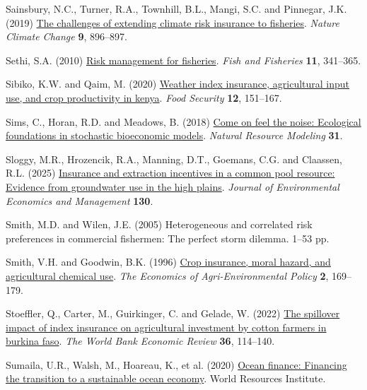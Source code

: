 \documentclass[
  letterpaper,
  DIV=11,
  numbers=noendperiod]{scrartcl}
\newlength{\cslhangindent}
\newenvironment{CSLReferences}[2] %
 {\begin{list}{}{%
  \setlength{\itemindent}{0pt}
  \setlength{\leftmargin}{0pt}
  \setlength{\parsep}{0pt}
  \ifodd #1
   \setlength{\leftmargin}{\cslhangindent}
   \setlength{\itemindent}{-1\cslhangindent}
  \fi
  \setlength{\itemsep}{#2\baselineskip}}}
 {\end{list}}
\theoremstyle{plain}
\theoremstyle{plain}
\theoremstyle{remark}
\begin{document}
\begin{CSLReferences}{1}{0}
Sainsbury, N.C., Turner, R.A., Townhill, B.L., Mangi, S.C. and Pinnegar,
J.K. (2019) \href{https://doi.org/10.1038/s41558-019-0645-z}{The
challenges of extending climate risk insurance to fisheries}.
\emph{Nature Climate Change} \textbf{9}, 896--897.

Sethi, S.A. (2010)
\href{https://doi.org/10.1111/j.1467-2979.2010.00363.x}{Risk management
for fisheries}. \emph{Fish and Fisheries} \textbf{11}, 341--365.

Sibiko, K.W. and Qaim, M. (2020)
\href{https://doi.org/10.1007/s12571-019-00987-y}{Weather index
insurance, agricultural input use, and crop productivity in kenya}.
\emph{Food Security} \textbf{12}, 151--167.

Sims, C., Horan, R.D. and Meadows, B. (2018)
\href{https://doi.org/10.1111/NRM.12191}{Come on feel the noise:
Ecological foundations in stochastic bioeconomic models}. \emph{Natural
Resource Modeling} \textbf{31}.

Sloggy, M.R., Hrozencik, R.A., Manning, D.T., Goemans, C.G. and
Claassen, R.L. (2025)
\href{https://doi.org/10.1016/j.jeem.2025.103125}{Insurance and
extraction incentives in a common pool resource: Evidence from
groundwater use in the high plains}. \emph{Journal of Environmental
Economics and Management} \textbf{130}.

Smith, M.D. and Wilen, J.E. (2005) Heterogeneous and correlated risk
preferences in commercial fishermen: The perfect storm dilemma. 1--53
pp.

Smith, V.H. and Goodwin, B.K. (1996)
\href{https://doi.org/10.2307/1243714}{Crop insurance, moral hazard, and
agricultural chemical use}. \emph{The Economics of Agri-Environmental
Policy} \textbf{2}, 169--179.

Stoeffler, Q., Carter, M., Guirkinger, C. and Gelade, W. (2022)
\href{https://doi.org/10.1093/wber}{The spillover impact of index
insurance on agricultural investment by cotton farmers in burkina faso}.
\emph{The World Bank Economic Review} \textbf{36}, 114--140.

Sumaila, U.R., Walsh, M., Hoareau, K., et al. (2020)
\href{https://www.oceanpanel.org/blue-}{Ocean finance: Financing the
transition to a sustainable ocean economy}. World Resources Institute.


\end{CSLReferences}
\end{document}
